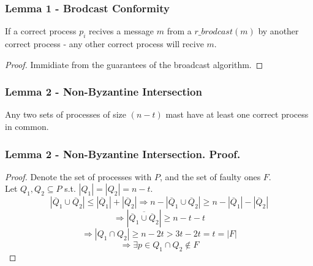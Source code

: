\begin{frame}
    \frametitle{Lemma 1 - Brodcast Conformity}
    \begin{lemma}
        If a correct process $p_i$ recives a message $m$ from a $r\_brodcast(m)$ by another correct process - 
        any other correct process will recive $m$.\\
    \end{lemma}

    \begin{proof}
        Immidiate from the guarantees of the broadcast algorithm.
    \end{proof}
\end{frame}
\begin{frame}
    \frametitle{Lemma 2 - Non-Byzantine Intersection}
    \begin{lemma}
        Any two sets of processes of size $(n-t)$ mast have
        at least one correct process in common.
    \end{lemma}
\end{frame}
\begin{frame}
    \frametitle{Lemma 2 - Non-Byzantine Intersection. Proof.}
    \begin{proof}
        Denote the set of processes with $P$, and the set of faulty ones $F$.\\
        Let $Q_1,Q_2\subseteq P$ s.t. $|Q_1|=|Q_2|=n-t$.\\
        \[
            |\overline{Q}_1\cup\overline{Q}_2|\leq |\overline{Q}_1|+|\overline{Q}_2|
            \Rightarrow n-|\overline{Q}_1\cup\overline{Q}_2|\geq n-|\overline{Q}_1|-|\overline{Q}_2|
        \]\[
            \Rightarrow |\overline{\overline{Q}_1\cup\overline{Q}_2}|\geq n-t-t
        \]\[
            \Rightarrow |Q_1\cap Q_2|\geq n-2t>3t-2t=t=|F|
        \]\[
            \Rightarrow \exists p\in Q_1\cap Q_2\notin F
        \]
    \end{proof}
\end{frame}

